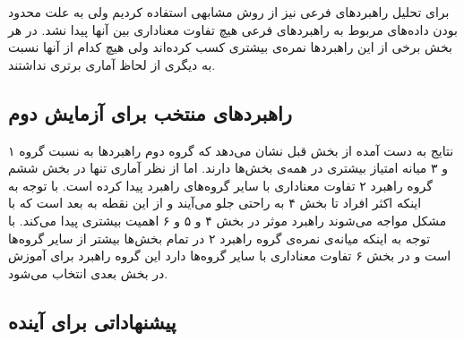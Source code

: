 \documentclass[twoside, a4paper,11pt]{book}
\numberwithin{equation}{chapter}
\numberwithin{table}{chapter}
\numberwithin{figure}{chapter}
\numberwithin{equation}{chapter}
\begin{document}
\begin{table}[]
\end{table}

برای تحلیل راهبردهای فرعی نیز از روش مشابهی استفاده کردیم ولی به علت محدود بودن داده‌های مربوط به راهبردهای فرعی هیچ تفاوت معناداری بین آنها پیدا نشد. در هر بخش برخی از این راهبردها نمره‌ی بیشتری کسب کرده‌اند ولی هیچ کدام از آنها نسبت به دیگری از لحاظ آماری برتری نداشتند.


\subsection{راهبردهای منتخب برای آزمایش دوم} \label{section:selectedStrategytest1}

نتایج به دست آمده از بخش قبل نشان می‌دهد که گروه دوم راهبردها به نسبت گروه ۱ و ۳ میانه امتیاز بیشتری در همه‌ی بخش‌ها دارند. اما از نظر آماری تنها در بخش ششم گروه راهبرد ۲ تفاوت معناداری با سایر گروه‌های راهبرد پیدا کرده است. با توجه به اینکه اکثر افراد تا بخش ۴ به راحتی جلو می‌آیند و از این نقطه به بعد است که با مشکل مواجه می‌شوند راهبرد موثر در بخش ۴ و ۵ و ۶ اهمیت بیشتری پیدا می‌کند. با توجه به اینکه میانه‌ی نمره‌ی گروه راهبرد ۲ در تمام بخش‌ها بیشتر از سایر گروه‌ها است و در بخش ۶ تفاوت معناداری با سایر گروه‌ها دارد این گروه راهبرد برای آموزش در بخش بعدی انتخاب می‌شود.

\subsection{پیشنهاداتی برای آینده}
\end{document}
